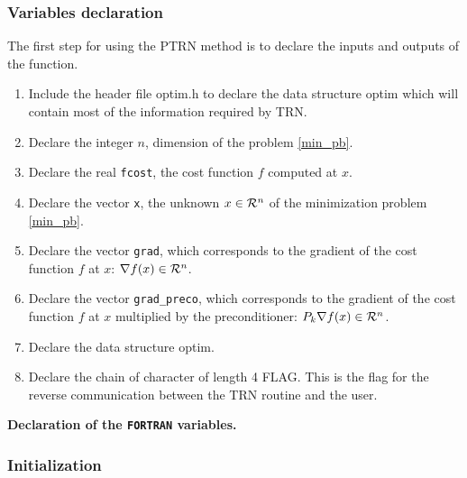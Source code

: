 \documentclass[a4paper,twoside,final,onecolumn,11pt,openright]{article}
\def \mathbb #1{{\cal #1}}
\begin{document}
\subsubsection{Variables declaration}
The first step for using the PTRN method is to declare the inputs and outputs of the function. 
\begin{enumerate}
 \item Include the header file optim.h to declare the data structure optim which will contain most of the information required by TRN.
 \item Declare the integer $n$, dimension of the problem \eqref{min_pb}.
 \item Declare the real \texttt{fcost}, the cost function $f$ computed at $x$.
 \item Declare the vector \texttt{x}, the unknown $x \in \mathbb{R}^{n}$ of the minimization problem \eqref{min_pb}.
 \item Declare the vector \texttt{grad}, which corresponds to the gradient of the cost function $f$ at $x$: $\nabla f(x) \in \mathbb{R}^{n}$.
\item Declare the vector \texttt{grad\_preco}, which corresponds to the gradient of the cost function $f$ at $x$ multiplied by the preconditioner: $P_k\nabla f(x) \in \mathbb{R}^{n}$.
 \item Declare the data structure optim.
 \item Declare the chain of character of length 4 FLAG. This is the flag for the reverse communication between the TRN routine and the user.
\end{enumerate}

\framebox{
\small
 
} 
\normalsize
\begin{center}
\textbf{Declaration of the \texttt{FORTRAN} variables.} 
\end{center}

\subsubsection{Initialization}
\end{document}
